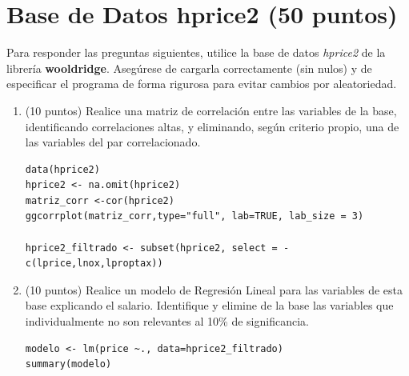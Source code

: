 \documentclass[letterpaper,11pt]{article}
\begin{document}
\section{Base de Datos hprice2 (50 puntos)}

Para responder las preguntas siguientes, utilice la base de datos \textit{hprice2} de la librería \textbf{wooldridge}. Asegúrese de cargarla correctamente (sin nulos) y de especificar el programa de forma rigurosa para evitar cambios por aleatoriedad.

\begin{enumerate}

    \item (10 puntos) Realice una matriz de correlación entre las variables de la base, identificando correlaciones altas, y eliminando, según criterio propio, una de las variables del par correlacionado.

\begin{lstlisting}
data(hprice2)
hprice2 <- na.omit(hprice2)
matriz_corr <-cor(hprice2)
ggcorrplot(matriz_corr,type="full", lab=TRUE, lab_size = 3)

hprice2_filtrado <- subset(hprice2, select = -c(lprice,lnox,lproptax))
\end{lstlisting}
\item (10 puntos) Realice un modelo de Regresión Lineal para las variables de esta base explicando el salario. Identifique y elimine de la base las variables que individualmente no son relevantes al 10\% de significancia.  
\begin{lstlisting}
modelo <- lm(price ~., data=hprice2_filtrado)
summary(modelo)
\end{lstlisting}



\end{enumerate}
\end{document}
